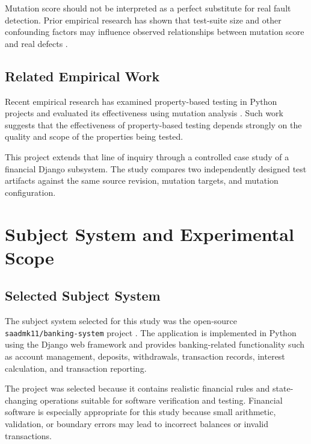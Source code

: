 \documentclass[12pt]{article}
\begin{document}
Mutation score should not be interpreted as a perfect substitute for real
fault detection. Prior empirical research has shown that test-suite size and
other confounding factors may influence observed relationships between
mutation score and real defects \cite{papadakis2018mutation}.

\subsection{Related Empirical Work}

Recent empirical research has examined property-based testing in Python
projects and evaluated its effectiveness using mutation analysis
\cite{ravi2025property}. Such work suggests that the effectiveness of
property-based testing depends strongly on the quality and scope of the
properties being tested.

This project extends that line of inquiry through a controlled case study of a
financial Django subsystem. The study compares two independently designed test artifacts against the same
source revision, mutation targets, and mutation configuration.


\section{Subject System and Experimental Scope}

\subsection{Selected Subject System}

The subject system selected for this study was the open-source
\texttt{saadmk11/banking-system} project \cite{bankingsystem}. The application is implemented in
Python using the Django web framework and provides banking-related
functionality such as account management, deposits, withdrawals, transaction
records, interest calculation, and transaction reporting.

The project was selected because it contains realistic financial rules and
state-changing operations suitable for software verification and testing.
Financial software is especially appropriate for this study because small
arithmetic, validation, or boundary errors may lead to incorrect balances or
invalid transactions.
\end{document}
